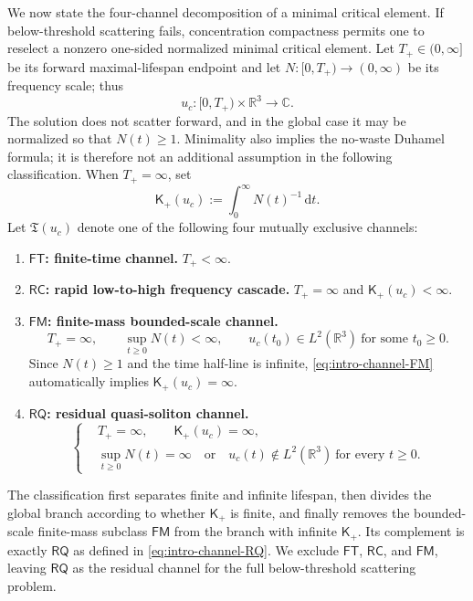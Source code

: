\documentclass{interact}
\numberwithin{equation}{section}
\theoremstyle{plain}
\theoremstyle{definition}
\theoremstyle{remark}
\newcommand{\R}{\mathbb R}
\newcommand{\C}{\mathbb C}
\newcommand{\dd}{\,\mathrm d}
\begin{document}
We now state the four-channel decomposition of a minimal critical element. If below-threshold scattering fails, concentration compactness permits one to reselect a nonzero one-sided normalized minimal critical element. Let $T_+\in(0,\infty]$ be its forward maximal-lifespan endpoint and let $N:[0,T_+)\to(0,\infty)$ be its frequency scale; thus
\[
 u_c:[0,T_+)\times\R^3\to\C.
\] The solution does not scatter forward, and in the global case it may be normalized so that $N(t)\ge1$. Minimality also implies the no-waste Duhamel formula; it is therefore not an additional assumption in the following classification. When $T_+=\infty$, set
\[
 \mathsf K_+(u_c):=\int_0^\infty N(t)^{-1}\dd t.
\]
Let $\mathfrak T(u_c)$ denote one of the following four mutually exclusive channels:
\begin{enumerate}[label=\textup{(\Roman*)},leftmargin=2.8em]
 \item \textbf{$\mathsf{FT}$: finite-time channel.} $T_+<\infty$.

 \item \textbf{$\mathsf{RC}$: rapid low-to-high frequency cascade.} $T_+=\infty$ and $\mathsf K_+(u_c)<\infty$.

 \item \textbf{$\mathsf{FM}$: finite-mass bounded-scale channel.}
 \begin{equation}\label{eq:intro-channel-FM}
  T_+=\infty,
  \qquad
  \sup_{t\ge0}N(t)<\infty,
  \qquad
  u_c(t_0)\in L^2(\R^3)\ \text{for some }t_0\ge0.
 \end{equation}
 Since $N(t)\ge1$ and the time half-line is infinite, \eqref{eq:intro-channel-FM} automatically implies $\mathsf K_+(u_c)=\infty$.

 \item \textbf{$\mathsf{RQ}$: residual quasi-soliton channel.}
 \begin{equation}\label{eq:intro-channel-RQ}
  \left\{
  \begin{aligned}
   &T_+=\infty,
   \qquad
   \mathsf K_+(u_c)=\infty,\\
   &\sup_{t\ge0}N(t)=\infty
   \quad\text{or}\quad
   u_c(t)\notin L^2(\R^3)\ \text{for every }t\ge0.
  \end{aligned}
  \right.
 \end{equation}
\end{enumerate}
The classification first separates finite and infinite lifespan, then divides the global branch according to whether $\mathsf K_+$ is finite, and finally removes the bounded-scale finite-mass subclass $\mathsf{FM}$ from the branch with infinite $\mathsf K_+$. Its complement is exactly $\mathsf{RQ}$ as defined in \eqref{eq:intro-channel-RQ}. We exclude $\mathsf{FT}$, $\mathsf{RC}$, and $\mathsf{FM}$, leaving $\mathsf{RQ}$ as the residual channel for the full below-threshold scattering problem.
\end{document}
